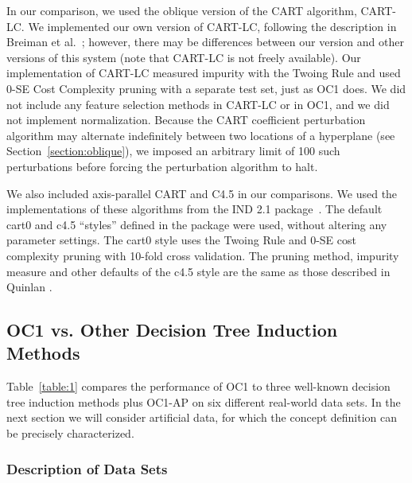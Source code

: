 In our comparison, we used the oblique version of the CART algorithm,
CART-LC\@.  We implemented our own version of CART-LC, following the
description in Brei\-man et al.~\citeyear[Chapter 5]{breiman/etal/84};
however, there may be differences between our version and other
versions of this system (note that CART-LC is not freely available).
Our implementation of CART-LC measured impurity with the Twoing Rule
and used 0-SE Cost Complexity pruning with a separate test set, just as
OC1 does.  We did not include any feature selection methods in CART-LC
or in OC1, and we did not implement normalization.  Because the CART
coefficient perturbation algorithm may alternate indefinitely between
two locations of a hyperplane (see Section~\ref{section:oblique}), we
imposed an arbitrary limit of 100 such perturbations before forcing
the perturbation algorithm to halt.

We also included axis-parallel CART and C4.5 in our comparisons.  We
used the implementations of these algorithms from the IND 2.1
package~\cite{buntine/92}.  The default cart0 and c4.5 ``styles''
defined in the package were used, without altering any parameter
settings.  The cart0 style uses the Twoing Rule and 0-SE cost
complexity pruning with 10-fold cross validation.  The pruning method,
impurity measure and other defaults of the c4.5 style are the same as
those described in Quinlan \citeyear{quinlan/93}.

\subsection{OC1 vs. Other Decision Tree Induction Methods}
\label{section:exp1}
Table~\ref{table:1} compares the performance of OC1 to three
well-known decision tree induction methods plus OC1-AP on six
different real-world data sets.  In the next section we will consider
artificial data, for which the concept definition can be precisely
characterized.

\subsubsection{Description of Data Sets}
\label{section:realdata}

